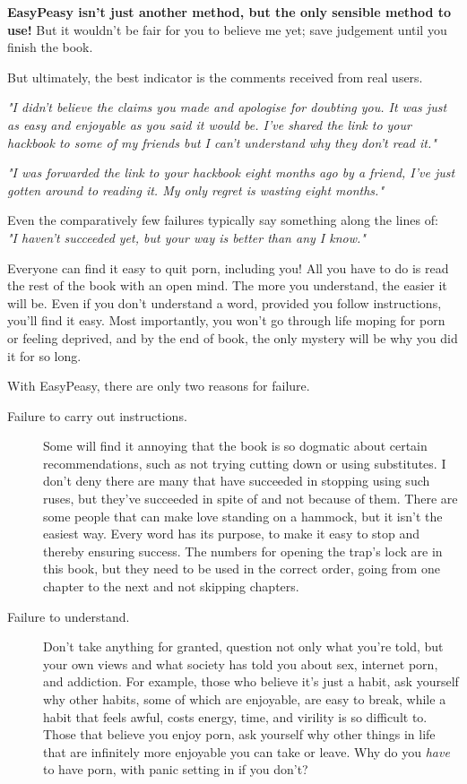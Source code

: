 \documentclass[easypeasy.tex]{subfiles}
\begin{document}
\textbf{EasyPeasy isn't just another method, but the only sensible method to use!} But it wouldn't be fair for you to believe me yet; save judgement until you finish the book.

But ultimately, the best indicator is the comments received from real users.

\textit{"I didn't believe the claims you made and apologise for doubting you. It was just as easy and enjoyable as you said it would be. I've shared the link to your hackbook to some of my friends but I can't understand why they don't read it."}

\textit{"I was forwarded the link to your hackbook eight months ago by a friend, I've just gotten around to reading it. My only regret is wasting eight months."}

Even the comparatively few failures typically say something along the lines of: \\ \textit{"I haven't succeeded yet, but your way is better than any I know."}

Everyone can find it easy to quit porn, including you! All you have to do is read the rest of the book with an open mind. The more you understand, the easier it will be. Even if you don't understand a word, provided you follow instructions, you'll find it easy. Most importantly, you won't go through life moping for porn or feeling deprived, and by the end of book, the only mystery will be why you did it for so long.

With EasyPeasy, there are only two reasons for failure.

\begin{description}
  \item [Failure to carry out instructions.] Some will find it annoying that the book is so dogmatic about certain recommendations, such as not trying cutting down or using substitutes. I don't deny there are many that have succeeded in stopping using such ruses, but they've succeeded in spite of and not because of them. There are some people that can make love standing on a hammock, but it isn't the easiest way. Every word has its purpose, to make it easy to stop and thereby ensuring success. The numbers for opening the trap's lock are in this book, but they need to be used in the correct order, going from one chapter to the next and not skipping chapters.

  \item [Failure to understand.] Don't take anything for granted, question not only what you're told, but your own views and what society has told you about sex, internet porn, and addiction. For example, those who believe it's just a habit, ask yourself why other habits, some of which are enjoyable, are easy to break, while a habit that feels awful, costs energy, time, and virility is so difficult to. Those that believe you enjoy porn, ask yourself why other things in life that are infinitely more enjoyable you can take or leave. Why do you \textit{have} to have porn, with panic setting in if you don't?
\end{description}
\end{document}
